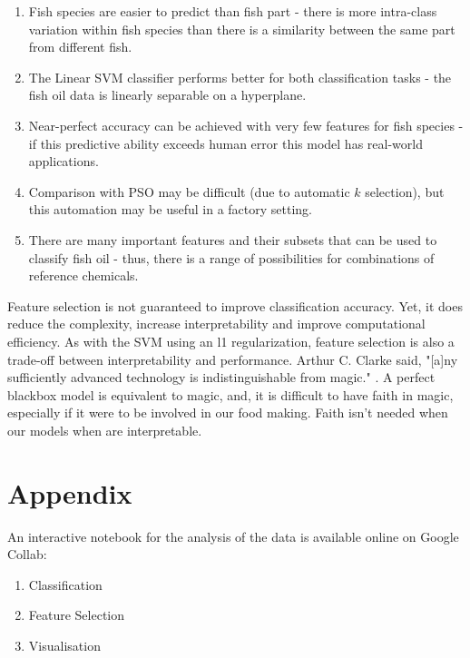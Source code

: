 \documentclass{article}
\begin{document}
\begin{enumerate}
  \item Fish species are easier to predict than fish part - there is more intra-class variation within fish species than there is a similarity between the same part from different fish.
  \item The Linear SVM classifier performs better for both classification tasks - the fish oil data is linearly separable on a hyperplane.
  \item Near-perfect accuracy can be achieved with very few features for fish species - if this predictive ability exceeds human error this model has real-world applications.
  \item Comparison with PSO may be difficult (due to automatic $k$ selection), but this automation may be useful in a factory setting.
  \item There are many important features and their subsets that can be used to classify fish oil - thus, there is a range of possibilities for combinations of reference chemicals.
\end{enumerate}

Feature selection is not guaranteed to improve classification accuracy.
Yet, it does reduce the complexity, increase interpretability and improve computational efficiency.
As with the SVM using an l1 regularization, feature selection is also a trade-off between interpretability and performance.
Arthur C. Clarke said, "[a]ny sufficiently advanced technology is indistinguishable from magic." \cite{clarke2013profiles}.
A perfect blackbox model is equivalent to magic, and, it is difficult to have faith in magic, especially if it were to be involved in our food making.
Faith isn't needed when our models when are interpretable.

\section{Appendix}
\label{sec:appendix}


An interactive notebook for the analysis of the data is available online on Google Collab:

\begin{enumerate}
  \item Classification \cite{wood2021classification}
  \item Feature Selection \cite{wood2021feature}
  \item Visualisation \cite{wood2021visualisation}
\end{enumerate}
\end{document}
